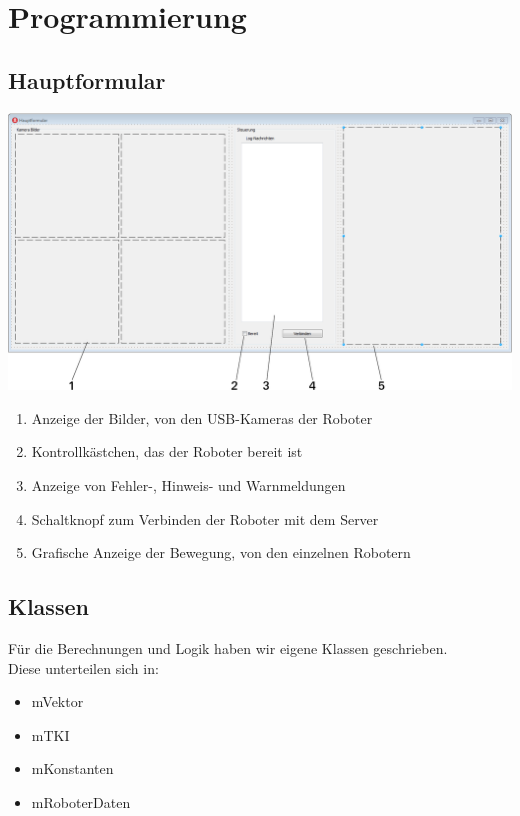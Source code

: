 \section{Programmierung}

\subsection{Hauptformular}
\begin{center}
	\includegraphics[scale=0.4]{Bilder/GUI.pdf}
\end{center}
\begin{enumerate}
	\item Anzeige der Bilder, von den USB-Kameras der Roboter 
	\item Kontrollkästchen, das der Roboter bereit ist
	\item Anzeige von Fehler-, Hinweis- und Warnmeldungen
	\item Schaltknopf zum Verbinden der Roboter mit dem Server
	\item Grafische Anzeige der Bewegung, von den einzelnen Robotern\\
\end{enumerate}


\subsection{Klassen}
Für die Berechnungen und Logik haben wir eigene Klassen geschrieben.\\
\newline
Diese unterteilen sich in:
\begin{itemize}
	\item mVektor
	\item mTKI
	\item mKonstanten
	\item mRoboterDaten
\end{itemize}

